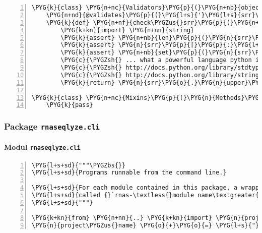 \begin{Verbatim}[commandchars=\\\{\},numbers=left,firstnumber=1,stepnumber=5]
\PYG{k}{class} \PYG{n+nc}{Validators}\PYG{p}{(}\PYG{n+nb}{object}\PYG{p}{)}\PYG{p}{:}
    \PYG{n+nd}{@validates}\PYG{p}{(}\PYG{l+s}{'}\PYG{l+s}{srr}\PYG{l+s}{'}\PYG{p}{)}
    \PYG{k}{def} \PYG{n+nf}{check\PYGZus{}srr}\PYG{p}{(}\PYG{n+nb+bp}{self}\PYG{p}{,} \PYG{n}{key}\PYG{p}{,} \PYG{n}{srr}\PYG{p}{)}\PYG{p}{:}
        \PYG{k+kn}{import} \PYG{n+nn}{string}
        \PYG{k}{assert} \PYG{n+nb}{len}\PYG{p}{(}\PYG{n}{srr}\PYG{p}{)} \PYG{o}{==} \PYG{l+m+mi}{9}
        \PYG{k}{assert} \PYG{n}{srr}\PYG{p}{[}\PYG{p}{:}\PYG{l+m+mi}{3}\PYG{p}{]} \PYG{o}{==} \PYG{l+s}{'}\PYG{l+s}{SRR}\PYG{l+s}{'}
        \PYG{k}{assert} \PYG{n+nb}{set}\PYG{p}{(}\PYG{n}{srr}\PYG{p}{[}\PYG{l+m+mi}{3}\PYG{p}{:}\PYG{p}{]}\PYG{p}{)} \PYG{o}{\textless{}} \PYG{n+nb}{set}\PYG{p}{(}\PYG{n}{string}\PYG{o}{.}\PYG{n}{digits}\PYG{p}{)}
        \PYG{c}{\PYGZsh{} ... what a powerful language python is! :-)}
        \PYG{c}{\PYGZsh{} http://docs.python.org/library/stdtypes.html\PYGZsh{}set}
        \PYG{c}{\PYGZsh{} http://docs.python.org/library/string.html\PYGZsh{}string-constants}
        \PYG{k}{return} \PYG{n}{srr}\PYG{o}{.}\PYG{n}{upper}\PYG{p}{(}\PYG{p}{)}

\PYG{k}{class} \PYG{n+nc}{Mixins}\PYG{p}{(}\PYG{n}{Methods}\PYG{p}{,} \PYG{n}{Properties}\PYG{p}{,} \PYG{n}{Validators}\PYG{p}{)}\PYG{p}{:}
    \PYG{k}{pass}
\end{Verbatim}


\subsubsection{Package \texttt{rnaseqlyze.cli}}
\label{rnaseqlyze-pdf:package-rnaseqlyze-cli}

\paragraph{Modul \texttt{rnaseqlyze.cli}}
\label{rnaseqlyze-pdf:modul-rnaseqlyze-cli}
\begin{Verbatim}[commandchars=\\\{\},numbers=left,firstnumber=1,stepnumber=5]
\PYG{l+s+sd}{"""\PYGZbs{}}
\PYG{l+s+sd}{Programs runnable from the command line.}

\PYG{l+s+sd}{For each module contained in this package, a wrapper script}
\PYG{l+s+sd}{called {}`rnas-\textless{}module name\textgreater{}{}` will be installed in {}`\textless{}prefix\textgreater{}/bin{}`.}
\PYG{l+s+sd}{"""}

\PYG{k+kn}{from} \PYG{n+nn}{..} \PYG{k+kn}{import} \PYG{n}{project\PYGZus{}name}
\PYG{n}{project\PYGZus{}name} \PYG{o}{+}\PYG{o}{=} \PYG{l+s}{"}\PYG{l+s}{-cli}\PYG{l+s}{"}
\end{Verbatim}


